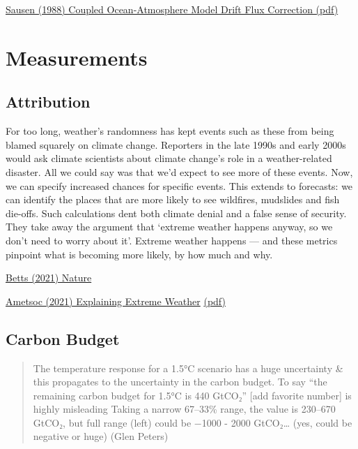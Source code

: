 \documentclass[
]{book}
\begin{document}
\href{pdf/Barthel_1988_Coupled_ocean_atmosphere_models_with_flux_corection.pdf}{Sausen (1988) Coupled Ocean-Atmosphere Model Drift Flux Correction (pdf)}

\hypertarget{part-measurements}{%
\part{Measurements}\label{part-measurements}}

\hypertarget{attribution}{%
\chapter{Attribution}\label{attribution}}

For too long, weather's randomness has kept events such as these from being blamed squarely on climate change. Reporters in the late 1990s and early 2000s would ask climate scientists about climate change's role in a weather-related disaster. All we could say was that we'd expect to see more of these events. Now, we can specify increased chances for specific events. This extends to forecasts: we can identify the places that are more likely to see wildfires, mudslides and fish die-offs. Such calculations dent both climate denial and a false sense of security. They take away the argument that `extreme weather happens anyway, so we don't need to worry about it'. Extreme weather happens --- and these metrics pinpoint what is becoming more likely, by how much and why.

\href{https://www.nature.com/articles/d41586-021-00185-x}{Betts (2021) Nature}

\href{https://www.ametsoc.org/ams/index.cfm/publications/bulletin-of-the-american-meteorological-society-bams/explaining-extreme-events-from-a-climate-perspective/}{Ametsoc (2021) Explaining Extreme Weather}
\href{pdf/Ametsoc_2021_Explaining_Extreme_2019.pdf}{(pdf)}

\hypertarget{carbon-budget}{%
\chapter{Carbon Budget}\label{carbon-budget}}

\begin{quote}
The temperature response for a 1.5°C scenario has a huge uncertainty \& this propagates to the uncertainty in the carbon budget.
To say ``the remaining carbon budget for 1.5°C is 440 GtCO₂'' {[}add favorite number{]} is highly misleading
Taking a narrow 67--33\% range, the value is 230--670 GtCO₂, but full range (left) could be −1000 - 2000 GtCO₂\ldots{} (yes, could be negative or huge)
(Glen Peters)
\end{quote}
\end{document}
